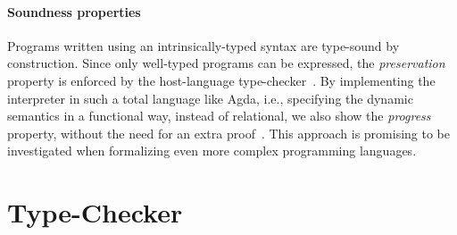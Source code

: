 \documentclass[review]{elsarticle}
\theoremstyle{definition}
\begin{document}

\paragraph{Soundness properties}{Programs written using an intrinsically-typed syntax are type-sound by
construction. Since only well-typed programs can be expressed, the \emph{preservation} property is
enforced by the host-language type-checker~\cite{Amin17}. By implementing the interpreter in such a
total language like Agda, i.e., specifying the dynamic semantics in a functional way, instead of
relational, we also show the \emph{progress} property, without the need for an extra proof~\cite{Owens2016}.
This approach is promising to be investigated when formalizing even more complex programming languages.}

\section{Type-Checker}\label{sec:typechecker}
\end{document}
